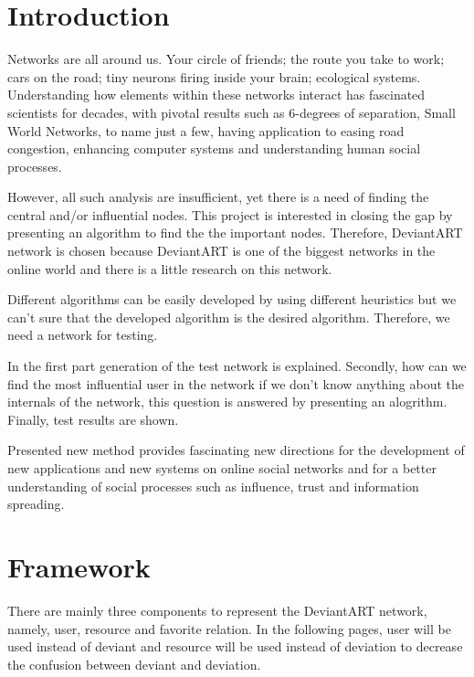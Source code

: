 \documentclass[12pt,a4paper]{report}
\begin{document}
\tableofcontents

\chapter{Introduction}
	
	\par \hspace{0.6cm}Networks are all around us.  Your circle of friends; the route you take to work; cars on the road; tiny neurons firing inside your brain; ecological systems.  Understanding how elements within these networks interact has fascinated scientists for decades, with pivotal results such as 6-degrees of separation, Small World Networks, to name just a few, having application to easing road congestion, enhancing computer systems and understanding human social processes. 

	\par However, all such analysis are insufficient, yet there is a need of finding the central and/or influential nodes. This project is interested in closing the gap by presenting an algorithm to find the the important nodes. Therefore, DeviantART network is chosen because DeviantART is one of the biggest networks in the online world and there is a little research on this network. 

	\par Different algorithms can be easily developed by using different heuristics but we can't sure that the developed algorithm is the desired algorithm. Therefore, we need a network for testing. 

	\par In the first part generation of the test network is explained. Secondly, how can we find the most influential user in the network if we don't know anything about the internals of the network, this question is answered by presenting an alogrithm. Finally, test results are shown.

	Presented new method provides fascinating new directions for the development of new applications and new systems on online social networks and for a better understanding of social processes such as influence, trust and information spreading.

\chapter{Framework} 

	\hspace{0.6cm}There are mainly three components to represent the DeviantART network, namely, user, resource and favorite relation. In the following pages, user will be used instead of  deviant and resource will be used instead of deviation to decrease the confusion between deviant and deviation.
\end{document}
